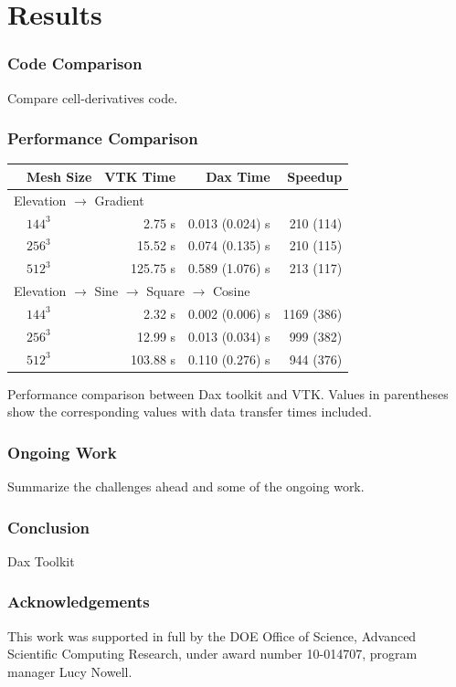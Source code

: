\documentclass[brown]{beamer}
\begin{document}
\section{Results}

\frame
{
  \frametitle{Code Comparison}
  Compare cell-derivatives code.
}

\frame
{
  \frametitle{Performance Comparison}
  \begin{table}[htbp]
    \centering
    \label{tab:Results}
    \begin{tabular}{llrrr}
      \qquad & Mesh Size & VTK Time & Dax Time & Speedup \\
      \hline
      \multicolumn{5}{l}{Elevation $\rightarrow$ Gradient} \\
      & $144^3$ & 2.75 s & 0.013 (0.024) s & 210 (114) \\
      & $256^3$ &  15.52 s & 0.074 (0.135) s & 210 (115) \\
      & $512^3$ &  125.75 s & 0.589 (1.076) s &  213 (117) \\
      \multicolumn{5}{l}{Elevation $\rightarrow$ Sine $\rightarrow$ Square $\rightarrow$ Cosine} \\
      & $144^3$ & 2.32 s & 0.002 (0.006) s &  1169 (386) \\
      & $256^3$ &  12.99 s & 0.013 (0.034) s & 999 (382) \\
      & $512^3$ & 103.88 s & 0.110 (0.276) s &  944 (376) \\
    \end{tabular} 
  \end{table}
  {Performance comparison between Dax toolkit and VTK. Values in
  parentheses show the corresponding values with data transfer times
  included}.
}

\frame
{
  \frametitle{Ongoing Work}
  Summarize the challenges ahead and some of the ongoing work.
}

\frame
{
  \frametitle{Conclusion}
  Dax Toolkit
}

\frame
{
  \frametitle{Acknowledgements}
  This work was supported in full by the DOE Office of Science, Advanced
  Scientific Computing Research, under award number 10-014707, program manager
  Lucy Nowell.
}
\end{document}
